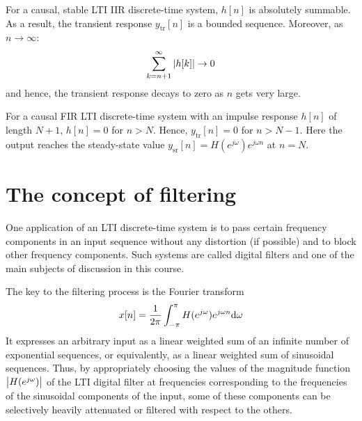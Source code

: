 \documentclass[../../main/main.tex]{subfiles}
\begin{document}
For a causal, stable LTI IIR discrete-time system, \( h[n] \) is absolutely summable. As a result, the transient response \( y_{\mathrm{tr}}[n] \) is a bounded sequence. Moreover, as \( n \to \infty \):
\begin{equation}
    \sum_{k=n+1}^{\infty} \abs{h[k]}
    \to
    0
    \label{eq:L09_S53_1}
\end{equation}
and hence, the transient response decays to zero as \( n \) gets very large.

For a causal FIR LTI discrete-time system with an impulse response \( h[n] \) of length \( N+1 \), \( h[n] = 0 \) for \( n > N \). Hence, \( y_{\mathrm{tr}}[n] = 0 \) for \( n > N-1 \). Here the output reaches the steady-state value \( y_{\mathrm{sr}}[n] = H(e^{j \omega}) e^{j \omega n} \) at \( n = N \).





\section{The concept of filtering}
One application of an LTI discrete-time system is to pass certain frequency components in an input sequence without any distortion (if possible) and to block other frequency components. Such systems are called digital filters and one of the main subjects of discussion in this course.

The key to the filtering process is the Fourier transform
\begin{equation}
    x[n]
    =
    \frac{1}{2\pi} \int_{-\pi}^{\pi} H(e^{j \omega}) e^{j \omega n} \mathrm{d}{\omega}
    \label{eq:L09_S56_1}
\end{equation}
It expresses an arbitrary input as a linear weighted sum of an infinite number of exponential sequences, or equivalently, as a linear weighted sum of sinusoidal sequences.
Thus, by appropriately choosing the values of the magnitude function \( \abs{H(e^{j \omega})} \) of the LTI digital filter at frequencies corresponding to the frequencies of the sinusoidal components of the input, some of these components can be selectively heavily attenuated or filtered with respect to the others.
\end{document}
